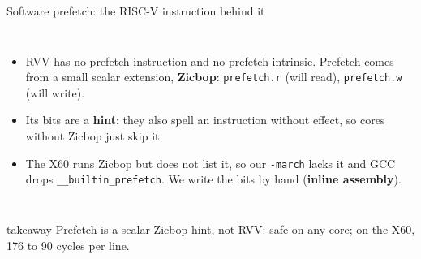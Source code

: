 \documentclass[aspectratio=169,10pt,t]{beamer}
\newcommand{\term}[1]{\textcolor{psblue!85!black}{\textbf{#1}}} %
\newcommand{\code}[1]{\texttt{#1}}
\newcommand{\takeaway}[1]{\par\vfill
  \begin{beamercolorbox}[wd=\textwidth,sep=4pt,rounded=true]{takeaway}
    \small #1
  \end{beamercolorbox}}
\begin{document}
\begin{frame}{Software prefetch: the RISC-V instruction behind it}
  \begin{columns}[T,onlytextwidth]
    
    \vspace{1mm}
    \begin{itemize}\small
      \item RVV has no prefetch instruction and no prefetch intrinsic. Prefetch comes from a small
            scalar extension, \term{Zicbop}: \code{prefetch.r} (will read), \code{prefetch.w} (will write).
      \item Its bits are a \term{hint}: they also spell an instruction without effect, so cores
            without Zicbop just skip it.
      \item The X60 runs Zicbop but does not list it, so our \code{-march} lacks it and GCC drops
            \code{\_\_builtin\_prefetch}. We write the bits by hand (\term{inline assembly}).
    \end{itemize}
  \end{columns}
  \takeaway{Prefetch is a scalar Zicbop hint, not RVV: safe on any core; on the X60, 176 to 90 cycles per line.}
\end{frame}
\end{document}
